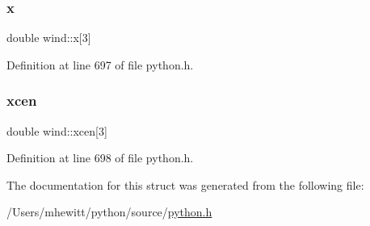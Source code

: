 \subsubsection{\texorpdfstring{x}{x}}
{\footnotesize\ttfamily double wind\+::x\mbox{[}3\mbox{]}}



Definition at line 697 of file python.\+h.

\mbox{\label{structwind_a289fcd4f4c7e344d112785545192cffe}} 
\subsubsection{\texorpdfstring{xcen}{xcen}}
{\footnotesize\ttfamily double wind\+::xcen\mbox{[}3\mbox{]}}



Definition at line 698 of file python.\+h.



The documentation for this struct was generated from the following file\+:\begin{DoxyCompactItemize}
\item 
/\+Users/mhewitt/python/source/\hyperlink{python_8h}{python.\+h}\end{DoxyCompactItemize}
